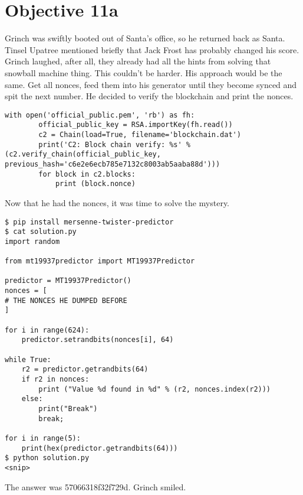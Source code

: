 \chapter{Objective 11a}

Grinch was swiftly booted out of Santa's office, so he returned back as Santa.
{\color{codegreen}Tinsel Upatree} mentioned briefly that Jack Frost has probably changed his score.
Grinch laughed, after all, they already had all the hints from solving that snowball machine thing.
This couldn't be harder. His approach would be the same. Get all nonces, feed them into his generator until they become synced and spit the next number.
He decided to verify the blockchain and print the nonces.

\begin{verbatim}
with open('official_public.pem', 'rb') as fh:
        official_public_key = RSA.importKey(fh.read())
        c2 = Chain(load=True, filename='blockchain.dat')
        print('C2: Block chain verify: %s' % (c2.verify_chain(official_public_key, previous_hash='c6e2e6ecb785e7132c8003ab5aaba88d')))
        for block in c2.blocks:
            print (block.nonce)
\end{verbatim}

Now that he had the nonces, it was time to solve the mystery.

\begin{verbatim}
$ pip install mersenne-twister-predictor
$ cat solution.py
import random

from mt19937predictor import MT19937Predictor

predictor = MT19937Predictor()
nonces = [
# THE NONCES HE DUMPED BEFORE
]

for i in range(624):
    predictor.setrandbits(nonces[i], 64)

while True:
    r2 = predictor.getrandbits(64)
    if r2 in nonces:
        print ("Value %d found in %d" % (r2, nonces.index(r2)))
    else:
        print("Break")
        break;

for i in range(5):
    print(hex(predictor.getrandbits(64)))
$ python solution.py
<snip>
\end{verbatim}

The answer was 57066318f32f729d. Grinch smiled.
